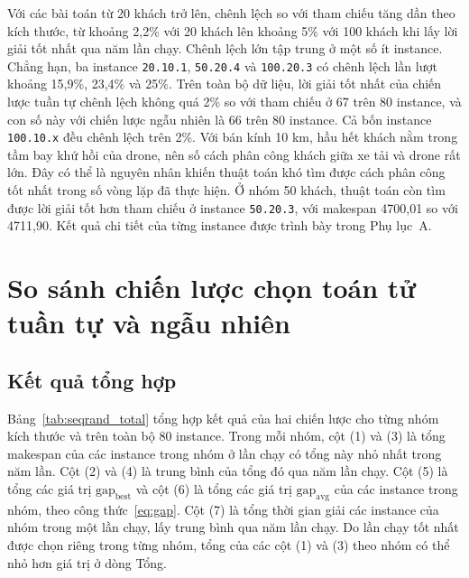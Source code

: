 \documentclass[../DoAn.tex]{subfiles}
\begin{document}
Với các bài toán từ 20 khách trở lên, chênh lệch so với tham chiếu tăng dần theo kích thước, từ khoảng 2,2\% với 20 khách lên khoảng 5\% với 100 khách khi lấy lời giải tốt nhất qua năm lần chạy. Chênh lệch lớn tập trung ở một số ít instance. Chẳng hạn, ba instance \texttt{20.10.1}, \texttt{50.20.4} và \texttt{100.20.3} có chênh lệch lần lượt khoảng 15,9\%, 23,4\% và 25\%. Trên toàn bộ dữ liệu, lời giải tốt nhất của chiến lược tuần tự chênh lệch không quá 2\% so với tham chiếu ở 67 trên 80 instance, và con số này với chiến lược ngẫu nhiên là 66 trên 80 instance. Cả bốn instance \texttt{100.10.x} đều chênh lệch trên 2\%. Với bán kính 10 km, hầu hết khách nằm trong tầm bay khứ hồi của drone, nên số cách phân công khách giữa xe tải và drone rất lớn. Đây có thể là nguyên nhân khiến thuật toán khó tìm được cách phân công tốt nhất trong số vòng lặp đã thực hiện. Ở nhóm 50 khách, thuật toán còn tìm được lời giải tốt hơn tham chiếu ở instance \texttt{50.20.3}, với makespan 4700,01 so với 4711,90. Kết quả chi tiết của từng instance được trình bày trong Phụ lục~A.

\section{So sánh chiến lược chọn toán tử tuần tự và ngẫu nhiên}
\label{sec:exp_seqrand}

\subsection{Kết quả tổng hợp}

Bảng~\ref{tab:seqrand_total} tổng hợp kết quả của hai chiến lược cho từng nhóm kích thước và trên toàn bộ 80 instance. Trong mỗi nhóm, cột (1) và (3) là tổng makespan của các instance trong nhóm ở lần chạy có tổng này nhỏ nhất trong năm lần. Cột (2) và (4) là trung bình của tổng đó qua năm lần chạy. Cột (5) là tổng các giá trị $\mathrm{gap}_{\text{best}}$ và cột (6) là tổng các giá trị $\mathrm{gap}_{\text{avg}}$ của các instance trong nhóm, theo công thức~\eqref{eq:gap}. Cột (7) là tổng thời gian giải các instance của nhóm trong một lần chạy, lấy trung bình qua năm lần chạy. Do lần chạy tốt nhất được chọn riêng trong từng nhóm, tổng của các cột (1) và (3) theo nhóm có thể nhỏ hơn giá trị ở dòng Tổng.
\end{document}
